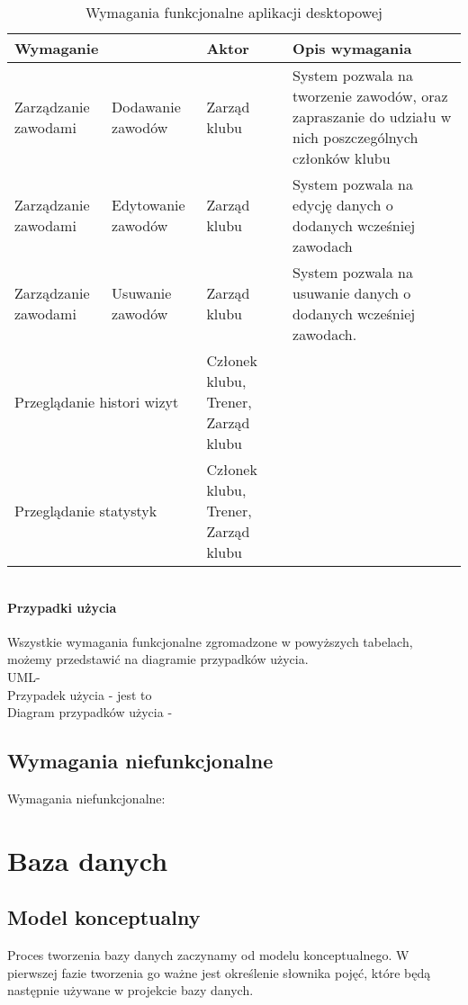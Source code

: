 \documentclass[12pt,twoside]{report}
\begin{document}
\begin{table}[h!]
	\centering
	\begin{tabular}{|p{3cm}|p{3cm}|p{4cm}|p{6cm}|}			
		\hline
		\multicolumn{2}{|l|}{Wymaganie} & Aktor & Opis wymagania\\
		\hline
		Zarządzanie zawodami & Dodawanie zawodów & Zarząd klubu& System pozwala na tworzenie zawodów, oraz zapraszanie do udziału w nich poszczególnych członków klubu\\	
		\hline	
		Zarządzanie zawodami & Edytowanie zawodów & Zarząd klubu& System pozwala na edycję danych o dodanych wcześniej zawodach\\
		\hline
		Zarządzanie zawodami & Usuwanie zawodów & Zarząd klubu& System pozwala na usuwanie danych o dodanych wcześniej zawodach.\\
		\hline
		\multicolumn{2}{|l|}{Przeglądanie histori wizyt}& Członek klubu, Trener, Zarząd klubu&\\
		\hline
		\multicolumn{2}{|l|}{Przeglądanie statystyk}&Członek klubu, Trener, Zarząd klubu&\\
		\hline
	\end{tabular}
	\caption{Wymagania funkcjonalne aplikacji desktopowej}
	\label{funkcjonalneDesktop2}
\end{table}
\newpage
$\ $
\newpage
\subsubsection{Przypadki użycia}
Wszystkie wymagania funkcjonalne zgromadzone w powyższych tabelach, możemy przedstawić na diagramie przypadków użycia.
\\
UML-
\\
Przypadek użycia - jest to 
\\
Diagram przypadków użycia - 
\\
\section{Wymagania niefunkcjonalne}
Wymagania niefunkcjonalne:
\newpage
\chapter{Baza danych}
\section{Model konceptualny}
Proces tworzenia bazy danych zaczynamy od modelu konceptualnego. W pierwszej fazie tworzenia go ważne jest określenie słownika pojęć, które będą następnie używane w projekcie bazy danych.
\end{document}
